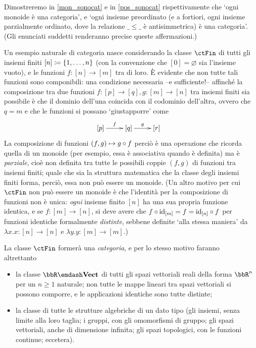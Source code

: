Dimostreremo in \autoref{mon_sonocat} e in \autoref{pos_sonocat} rispettivamente che `ogni monoide è una categoria', e `ogni insieme preordinato (e a fortiori, ogni insieme parzialmente ordinato, dove la relazione $\_\le\_$ è antisimmetrica) è una categoria'. (Gli enunciati suddetti renderanno precise queste affermazioni.)
\begin{example}
Un esempio naturale di categoria nasce considerando la classe $\ctFin$ di tutti gli insiemi finiti $[n]\coloneqq \{1,\dots,n\}$ (con la convenzione che $[0]=\varnothing$ sia l'insieme vuoto), e le funzioni $f : [n] \to [m]$ tra di loro. \`E evidente che non tutte tali funzioni sono componibili: una condizione necessaria --e sufficiente!-- affinché la composizione tra due funzioni $f : [p] \to [q],g : [m] \to [n]$ tra insiemi finiti sia possibile è che il dominio dell'una coincida con il codominio dell'altra, ovvero che $q=m$ e che le funzioni si possano `giustapporre' come
\[\xymatrix{
    [p] \ar[r]^-f & [q] \ar[r]^-g & [r]
}\]
La composizione di funzioni $(f,g)\mapsto g\circ f$ perciò è una operazione che ricorda quella di un monoide (per esempio, essa è associativa quando è definita) ma è \emph{parziale}, cioè non definita tra tutte le possibili coppie $(f,g)$ di funzioni tra insiemi finiti; quale che sia la struttura matematica che la classe degli insiemi finiti forma, perciò, essa non può essere un monoide. (Un altro motivo per cui $\ctFin$ non può essere un monoide è che l'identità per la composizione di funzioni non è unica: \emph{ogni} insieme finito $[n]$ ha una sua propria funzione identica, e se $f : [m]\to [n]$, si deve avere che $f\circ \mathrm{id}_{[m]}=f=\mathrm{id}_{[n]}\circ f$ per funzioni identiche formalmente \emph{distinte}, sebbene definite `alla stessa maniera' da $\lambda x.x : [n]\to [n]$ e $\lambda y.y : [m]\to [m]$.)

La classe $\ctFin$ formerà una \emph{categoria}, e per lo stesso motivo faranno altrettanto
\begin{itemize}
    \item {} la classe $\bbR\emdash\ctVect$ di tutti gli spazi vettoriali reali della forma $\bbR^n$ per un $n\ge 1$ naturale; non tutte le mappe lineari tra spazi vettoriali si possono comporre, e le applicazioni identiche sono tutte distinte;
    \item la classe di tutte le strutture algebriche di un dato tipo (gli insiemi, senza limite alla loro taglia; i gruppi, con gli omomorfismi di gruppo; gli spazi vettoriali, anche di dimensione infinita; gli spazi topologici, con le funzioni continue; eccetera).
\end{itemize}
\end{example}
